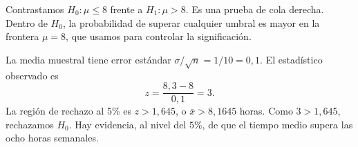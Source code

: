 Contrastamos $H_0:\mu\le 8$ frente a $H_1:\mu>8$. Es una prueba de cola derecha. Dentro de $H_0$, la probabilidad de superar cualquier umbral es mayor en la frontera $\mu=8$, que usamos para controlar la significación.

La media muestral tiene error estándar $\sigma/\sqrt n=1/10=0{,}1$. El estadístico observado es
\[
z=\frac{8{,}3-8}{0{,}1}=3.
\]
La región de rechazo al $5\%$ es $z>1{,}645$, o $\bar x>8{,}1645$ horas. Como $3>1{,}645$, rechazamos $H_0$. Hay evidencia, al nivel del $5\%$, de que el tiempo medio supera las ocho horas semanales.
